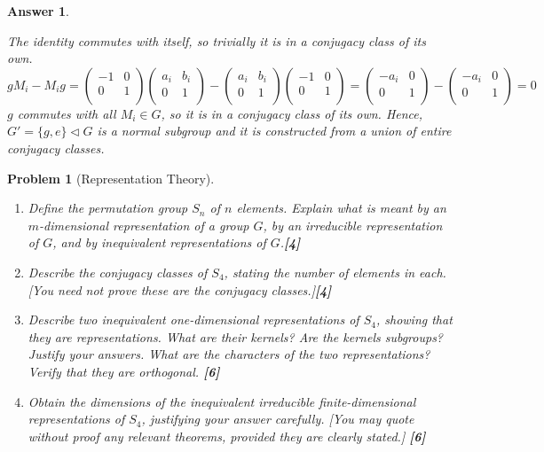 \documentclass[a4paper]{article}
\newtheorem{ans}{Answer}[section]
\theoremstyle{new}
\newtheorem{qns}{Problem}[section]
\begin{document}
\begin{ans}
\begin{enumerate}[label=(\alph*)]
The identity commutes with itself, so trivially it is in a conjugacy class of its own. 
$$gM_i-M_ig=\begin{pmatrix}-1&0\\0&1\\\end{pmatrix}\begin{pmatrix}a_i&b_i\\0&1\\\end{pmatrix}-\begin{pmatrix}a_i&b_i\\0&1\\\end{pmatrix}\begin{pmatrix}-1&0\\0&1\\\end{pmatrix}=\begin{pmatrix}-a_i&0\\0&1\\\end{pmatrix}-\begin{pmatrix}-a_i&0\\0&1\\\end{pmatrix}=0$$
$g$ commutes with all $M_i\in G$, so it is in a conjugacy class of its own. Hence, $G'=\{g,e\}\lhd G$ is a normal subgroup and it is constructed from a union of entire conjugacy classes.
\end{enumerate}
\end{ans}
\newpage
\begin{qns}[Representation Theory]\leavevmode
\begin{enumerate}[label=(\alph*)]
\item Define the permutation group $S_n$ of $n$ elements. Explain what is meant by an $m$-dimensional representation of a group $G$, by an irreducible representation of $G$, and by inequivalent representations of $G$.\hfill\textbf{[4]}
\item Describe the conjugacy classes of $S_4$, stating the number of elements in each. [You need not prove these are the conjugacy classes.]\hfill\textbf{[4]}
\item Describe two inequivalent one-dimensional representations of $S_4$, showing that they are representations. What are their kernels? Are the kernels subgroups? Justify your answers. What are the characters of the two representations? Verify that they are orthogonal. \hfill\textbf{[6]}
\item Obtain the dimensions of the inequivalent irreducible finite-dimensional representations of $S_4$, justifying your answer carefully. [You may quote without proof any relevant theorems, provided they are clearly stated.] \hfill\textbf{[6]}
\end{enumerate}
\end{qns}
\end{document}

